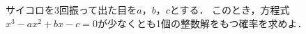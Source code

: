 \documentclass[../../main.tex]{subfiles}
\begin{document}
サイコロを3回振って出た目を$a$，$b$，$c$とする．
このとき，方程式$x^3-ax^2+bx-c=0$が少なくとも1個の整数解をもつ確率を求めよ．
\end{document}
